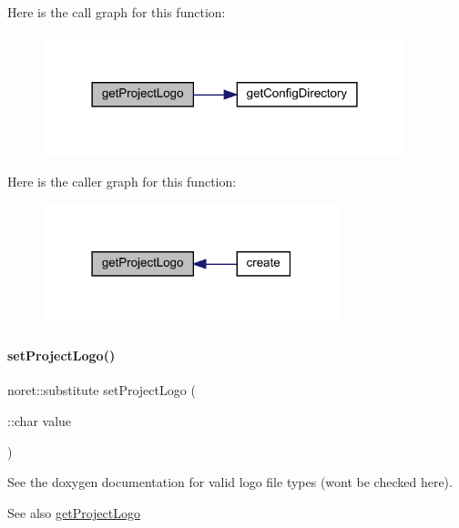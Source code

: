 Here is the call graph for this function\+:\nopagebreak
\begin{figure}[H]
\begin{center}
\leavevmode
\includegraphics[width=298pt]{class_matlab_doc_maker_a80cf6644c2827176070ac768e1c07538_cgraph}
\end{center}
\end{figure}
Here is the caller graph for this function\+:\nopagebreak
\begin{figure}[H]
\begin{center}
\leavevmode
\includegraphics[width=243pt]{class_matlab_doc_maker_a80cf6644c2827176070ac768e1c07538_icgraph}
\end{center}
\end{figure}
\mbox{\label{class_matlab_doc_maker_a01cb613496ec3db0c68249d8af346ac4}} 
\paragraph{\texorpdfstring{set\+Project\+Logo()}{setProjectLogo()}}
{\footnotesize\ttfamily noret\+::substitute set\+Project\+Logo (\begin{DoxyParamCaption}\item[{\+::char}]{value }\end{DoxyParamCaption})\hspace{0.3cm}{\ttfamily [static]}}

See the doxygen documentation for valid logo file types (wont be checked here).

\begin{DoxySeeAlso}{See also}
\hyperlink{class_matlab_doc_maker_a80cf6644c2827176070ac768e1c07538}{get\+Project\+Logo}
\end{DoxySeeAlso}

